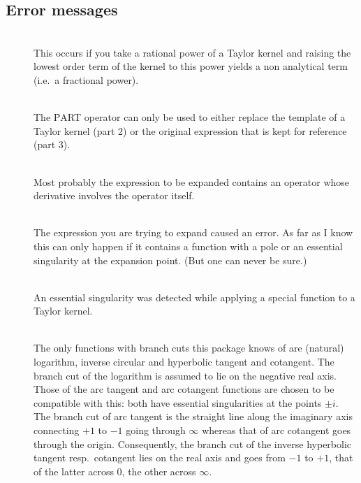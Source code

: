 \subsection{Error messages}
\begin{description}

\item[]\mbox{}\\
    This occurs if you take a rational power of a Taylor kernel
    and raising the lowest order term of the kernel to this
    power yields a non analytical term (i.e.\ a fractional power).

\item[]\mbox{}\\
%
    The \f{PART} operator can only be used to either replace the
    template of a Taylor kernel (part 2) or the original expression
    that is kept for reference (part 3).    

\item[]\mbox{}\\
    Most probably the expression to be expanded contains an operator
    whose derivative involves the operator itself.

\item[]\mbox{}\\
    The expression you are trying to expand caused an error.
    As far as I know this can only happen if it contains a function
    with a pole or an essential singularity at the expansion point.
    (But one can never be sure.)

\item[]\mbox{}\\
    An essential singularity was detected while applying a
    special function to a Taylor kernel.

\item[]\mbox{}\\
    The only functions with branch cuts this package knows of are
    (natural) logarithm, inverse circular and hyperbolic tangent and
    cotangent.  The branch cut of the logarithm is assumed to lie on
    the negative real axis.  Those of the arc tangent and arc
    cotangent functions are chosen to be compatible with this: both
    have essential singularities at the points $\pm i$.  The branch
    cut of arc tangent is the straight line along the imaginary axis
    connecting $+1$ to $-1$ going through $\infty$ whereas that of arc
    cotangent goes through the origin.  Consequently, the branch cut
    of the inverse hyperbolic tangent resp.\ cotangent lies on the
    real axis and goes from $-1$ to $+1$, that of the latter across
    $0$, the other across $\infty$.


\end{description}
